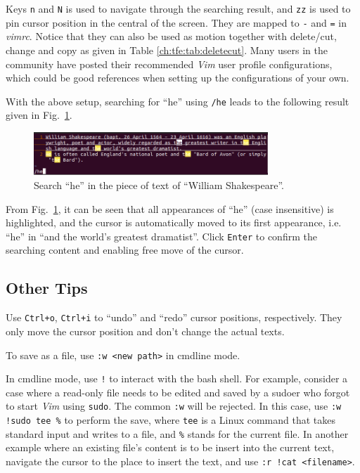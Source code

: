 Keys \verb|n| and \verb|N| is used to navigate through the searching result, and \verb|zz| is used to pin cursor position in the central of the screen. They are mapped to \verb|-| and \verb|=| in \textit{vimrc}. Notice that they can also be used as motion together with delete/cut, change and copy as given in Table \ref{ch:tfe:tab:deletecut}. Many users in the community have posted their recommended \textit{Vim} user profile configurations, which could be good references when setting up the configurations of your own.

With the above setup, searching for ``he'' using \verb|/he| leads to the following result given in Fig.~\ref{ch:tfe:fig:vimdemo2}.
\begin{figure}[htbp]
\centering
\includegraphics[width=250pt]{chapters/part-1/figures/vimdemo2.png}
\caption{Search ``he'' in the piece of text of ``William Shakespeare''.} \label{ch:tfe:fig:vimdemo2}
\end{figure}
From Fig.~\ref{ch:tfe:fig:vimdemo2}, it can be seen that all appearances of ``he'' (case insensitive) is highlighted, and the cursor is automatically moved to its first appearance, i.e. ``he'' in ``and the world's greatest dramatist''. Click \verb|Enter| to confirm the searching content and enabling free move of the cursor.

\subsection{Other Tips}

Use \verb|Ctrl+o|, \verb|Ctrl+i| to ``undo'' and ``redo'' cursor positions, respectively. They only move the cursor position and don't change the actual texts.

To save as a file, use \verb|:w <new path>| in cmdline mode.

In cmdline mode, use \verb|!| to interact with the bash shell. For example, consider a case where a read-only file needs to be edited and saved by a sudoer who forgot to start \textit{Vim} using \verb|sudo|. The common \verb|:w| will be rejected. In this case, use \verb|:w !sudo tee %| to perform the save, where \verb|tee| is a Linux command that takes standard input and writes to a file, and \verb|%| stands for the current file. In another example where an existing file's content is to be insert into the current text, navigate the cursor to the place to insert the text, and use \verb|:r !cat <filename>|.

